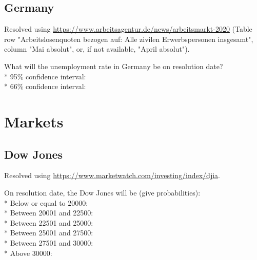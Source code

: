 \documentclass{article}
\begin{document}
\subsection*{Germany}

Resolved using
\href{https://www.arbeitsagentur.de/news/arbeitsmarkt-2020}{https://www.arbeitsagentur.de/news/arbeitsmarkt-2020}
(Table row "Arbeitslosenquoten bezogen auf: Alle zivilen Erwerbspersonen
insgesamt", column "Mai absolut", or, if not available, "April absolut").

\vspace{0.2cm}

What will the unemployment rate in Germany be on resolution date?\\*
95\% confidence interval: \null\hfill\underline{\hspace{8cm}}\\*
66\% confidence interval: \null\hfill\underline{\hspace{8cm}}

\section*{Markets}

\subsection*{Dow Jones}

Resolved using
\href{https://www.marketwatch.com/investing/index/djia}{https://www.marketwatch.com/investing/index/djia}.

\vspace{0.3cm}

On resolution date, the Dow Jones will be (give probabilities):\\*
Below or equal to 20000: \null\hfill\underline{\hspace{5cm}}\\*
Between 20001 and 22500: \null\hfill\underline{\hspace{5cm}}\\*
Between 22501 and 25000: \null\hfill\underline{\hspace{5cm}}\\*
Between 25001 and 27500: \null\hfill\underline{\hspace{5cm}}\\*
Between 27501 and 30000: \null\hfill\underline{\hspace{5cm}}\\*
Above 30000: \null\hfill\underline{\hspace{5cm}}
\end{document}
